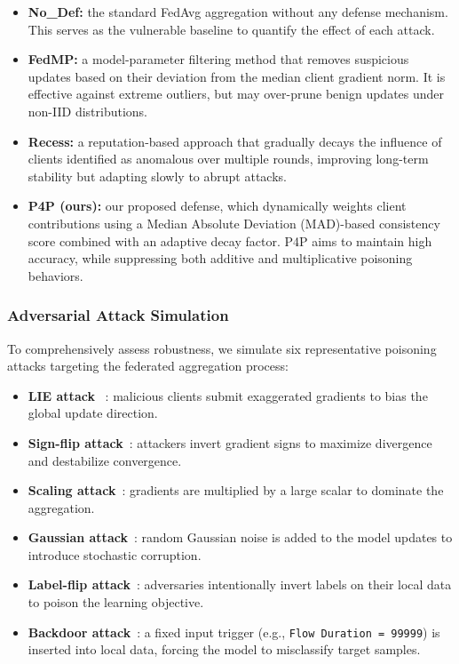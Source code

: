 \begin{itemize}
    \item \textbf{No\_Def:} the standard FedAvg aggregation without any defense mechanism. This serves as the vulnerable baseline to quantify the effect of each attack.
 
    \item \textbf{FedMP:} a model-parameter filtering method that removes suspicious updates based on their deviation from the median client gradient norm. It is effective against extreme outliers, but may over-prune benign updates under non-IID distributions.
    \item \textbf{Recess:} a reputation-based approach that gradually decays the influence of clients identified as anomalous over multiple rounds, improving long-term stability but adapting slowly to abrupt attacks.
       \item \textbf{P4P (ours):} our proposed defense, which dynamically weights client contributions using a Median Absolute Deviation (MAD)-based consistency score combined with an adaptive decay factor. P4P aims to maintain high accuracy, while suppressing both additive and multiplicative poisoning behaviors.
\end{itemize}

\subsubsection{Adversarial Attack Simulation}

To comprehensively assess robustness, we simulate six representative poisoning attacks targeting the federated aggregation process:

\begin{itemize}
    \item \textbf{LIE attack} ~\cite{baruch2019little}: malicious clients submit exaggerated gradients to bias the global update direction.
    \item \textbf{Sign-flip attack}~\cite{fung2020limit}: attackers invert gradient signs to maximize divergence and destabilize convergence.
    \item \textbf{Scaling attack}~\cite{blanchard2017machine}: gradients are multiplied by a large scalar to dominate the aggregation.
    \item \textbf{Gaussian attack}~\cite{bhagoji2019analyzing}: random Gaussian noise is added to the model updates to introduce stochastic corruption.
    \item \textbf{Label-flip attack}~\cite{xie2019dba}: adversaries intentionally invert labels on their local data to poison the learning objective.
    \item \textbf{Backdoor attack}~\cite{bagdasaryan2020backdoor1}: a fixed input trigger (e.g., \texttt{Flow Duration = 99999}) is inserted into local data, forcing the model to misclassify target samples.
\end{itemize}

